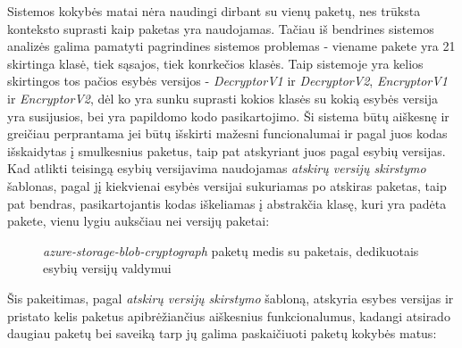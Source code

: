 Sistemos kokybės matai nėra naudingi dirbant su vienų paketų, nes trūksta konteksto suprasti kaip paketas yra naudojamas.
Tačiau iš bendrines sistemos analizės galima pamatyti pagrindines sistemos problemas - viename pakete yra 21 skirtinga klasė, tiek sąsajos, tiek konrkečios klasės.
Taip sistemoje yra kelios skirtingos tos pačios esybės versijos - \textit{DecryptorV1} ir \textit{DecryptorV2}, \textit{EncryptorV1} ir \textit{EncryptorV2}, dėl ko yra sunku
suprasti kokios klasės su kokią esybės versija yra susijusios, bei yra papildomo kodo pasikartojimo.
Ši sistema būtų aiškesnę ir greičiau perprantama jei būtų išskirti mažesni funcionalumai ir pagal juos kodas išskaidytas į smulkesnius paketus, taip pat atskyriant juos
pagal esybių versijas.
Kad atlikti teisingą esybių versijavima naudojamas \textit{atskirų versijų skirstymo} šablonas, pagal jį kiekvienai esybės versijai sukuriamas po atskiras paketas,
taip pat bendras, pasikartojantis kodas iškeliamas į abstrakčia klasę, kuri yra padėta pakete, vienu lygiu auksčiau nei versijų paketai:
\begin{figure}[H]
    \snugshade
    \endsnugshade
    \caption{\textit{azure-storage-blob-cryptograph} paketų medis su paketais, dedikuotais esybių versijų valdymui}
\end{figure}
Šis pakeitimas, pagal \textit{atskirų versijų skirstymo} šabloną, atskyria esybes versijas ir pristato kelis paketus apibrėžiančius aiškesnius funkcionalumus,
kadangi atsirado daugiau paketų bei saveiką tarp jų galima paskaičiuoti paketų kokybės matus:
